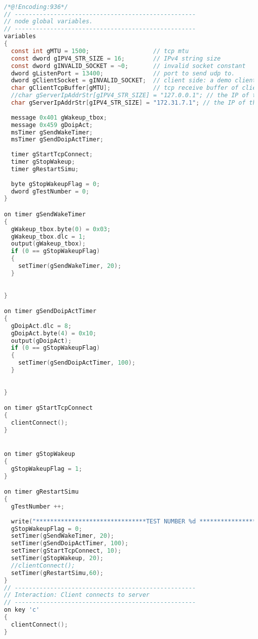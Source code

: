 \begin{lstlisting}[language=C]




/*@!Encoding:936*/
// ---------------------------------------------------
// node global variables.
// ---------------------------------------------------
variables
{
  const int gMTU = 1500;                  // tcp mtu
  const dword gIPV4_STR_SIZE = 16;        // IPv4 string size
  const dword gINVALID_SOCKET = ~0;       // invalid socket constant
  dword gListenPort = 13400;              // port to send udp to.
  dword gClientSocket = gINVALID_SOCKET;  // client side: a demo client's socket.
  char gClientTcpBuffer[gMTU];            // tcp receive buffer of client
  //char gServerIpAddrStr[gIPV4_STR_SIZE] = "127.0.0.1"; // the IP of the server
  char gServerIpAddrStr[gIPV4_STR_SIZE] = "172.31.7.1"; // the IP of the server
  
  message 0x401 gWakeup_tbox;
  message 0x459 gDoipAct;
  msTimer gSendWakeTimer;
  msTimer gSendDoipActTimer;
  
  timer gStartTcpConnect;
  timer gStopWakeup;
  timer gRestartSimu;
  
  byte gStopWakeupFlag = 0;
  dword gTestNumber = 0;
}

on timer gSendWakeTimer
{
  gWakeup_tbox.byte(0) = 0x03;
  gWakeup_tbox.dlc = 1;
  output(gWakeup_tbox);
  if (0 == gStopWakeupFlag)
  {
    setTimer(gSendWakeTimer, 20);
  }
  
  
}

on timer gSendDoipActTimer
{
  gDoipAct.dlc = 8;
  gDoipAct.byte(4) = 0x10;
  output(gDoipAct);
  if (0 == gStopWakeupFlag)
  {
    setTimer(gSendDoipActTimer, 100);
  }
  
  
}

on timer gStartTcpConnect
{
  clientConnect();
}


on timer gStopWakeup
{
  gStopWakeupFlag = 1;
}

on timer gRestartSimu
{
  gTestNumber ++;
  
  write("*******************************TEST NUMBER %d **********************************************",gTestNumber);
  gStopWakeupFlag = 0;
  setTimer(gSendWakeTimer, 20);
  setTimer(gSendDoipActTimer, 100);
  setTimer(gStartTcpConnect, 10);
  setTimer(gStopWakeup, 20);
  //clientConnect();
  setTimer(gRestartSimu,60);
}
// ---------------------------------------------------
// Interaction: Client connects to server
// ---------------------------------------------------
on key 'c'
{
  clientConnect();
}


\end{lstlisting}
